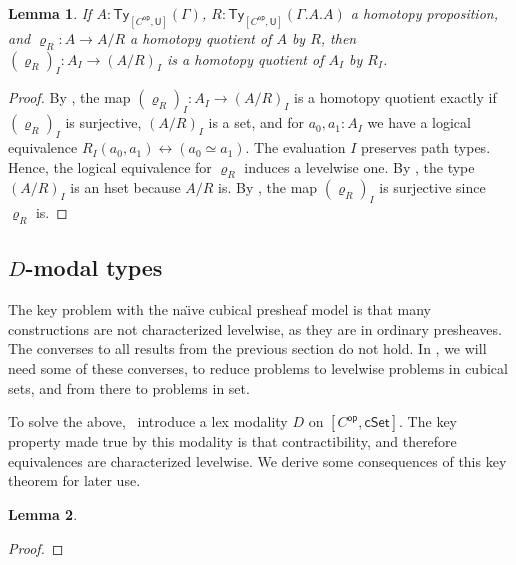 \documentclass[10pt,a4paper]{article}
\newtheorem{lemma}{Lemma}[section]
\newcommand{\U}{\mathsf{U}}
\newcommand{\cSet}{\mathsf{cSet}}
\DeclareMathOperator\op{\mathsf{op}}
\newcommand\Ty{\mathsf{Ty}}
\begin{document}
\begin{lemma}\label{prop:psh:levelwise-quotient-if-homotopy-quotient}
  If \(A \colon \Ty_{[C^{\op}, \U]}(\Gamma)\), \(R \colon \Ty_{[C^{\op}, \U]}(\Gamma.A.A)\) a homotopy proposition, and \(\varrho_R \colon A \to A/R\) a homotopy quotient of \(A\) by \(R\), then \((\varrho_R)_I \colon A_I \to (A/R)_I\) is a homotopy quotient of \(A_I\) by \(R_I\).
\end{lemma}
\begin{proof}
  By \cite[Theorem 18.2.3]{rijke2025intro}, the map \((\varrho_R)_I \colon A_I \to (A/R)_I\) is a homotopy quotient exactly if \((\varrho_R)_I\) is surjective, \((A/R)_I\) is a set, and for \(a_0, a_1 \colon A_I\) we have a logical equivalence \(R_I(a_0, a_1) \leftrightarrow (a_0 \simeq a_1)\).
  The evaluation \(I\) preserves path types.
  Hence, the logical equivalence for \(\varrho_R\) induces a levelwise one.
  By , the type \((A/R)_I\) is an hset because \(A/R\) is.
  By , the map \((\varrho_R)_I\) is surjective since \(\varrho_R\) is.
\end{proof}


\subsection{\texorpdfstring{\(D\)}{D}-modal types}

The key problem with the na{\"\i}ve cubical presheaf model is that many constructions are not characterized levelwise, as they are in ordinary presheaves.
The converses to all results from the previous section do not hold.
In , we will need some of these converses, to reduce problems to levelwise problems in cubical sets, and from there to problems in set.

To solve the above,~\cite{CRS21} introduce a lex modality \(D\) on \([C^{\op}, \cSet]\).
The key property made true by this modality is that contractibility, and therefore equivalences are characterized levelwise.
We derive some consequences of this key theorem for later use.

\begin{lemma}\label{prop:psh:modal:levelwise-n-type-iff-n-type}
\end{lemma}
\begin{proof}
  
\end{proof}
\end{document}
